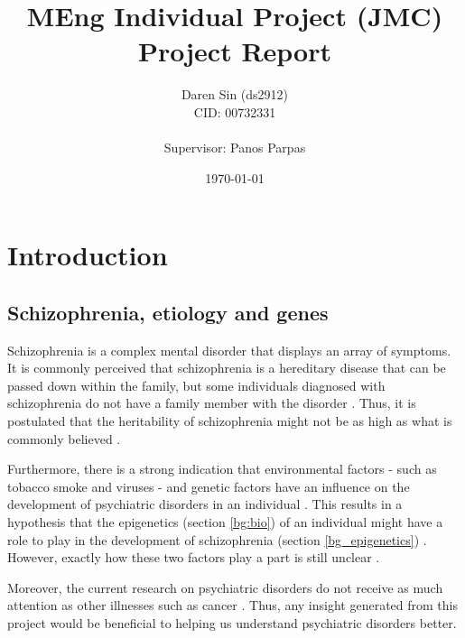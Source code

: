 \documentclass[12pt, twoside, a4paper]{article}
\begin{document}
\title{MEng Individual Project (JMC) \\ Project Report}

\author{Daren Sin (ds2912) \\ CID: 00732331 \\ \\ Supervisor: Panos Parpas}

\date{\today}
\maketitle

\tableofcontents

\newpage

\section{Introduction}


\subsection{Schizophrenia, etiology and genes}

Schizophrenia is a complex mental disorder that displays an array of symptoms. It is commonly perceived that schizophrenia is a hereditary disease that can be passed down within the family, but some individuals diagnosed with schizophrenia do not have a family member with the disorder \cite{RefWorks:8}. Thus, it is postulated that the heritability of schizophrenia might not be as high as what is commonly believed \cite{RefWorks:9}.

Furthermore, there is a strong indication that environmental factors - such as tobacco smoke and viruses - and genetic factors have an influence on the development of psychiatric disorders in an individual \cite{RefWorks:8, RefWorks:10}. This results in a hypothesis that the epigenetics (section \ref{bg:bio}) of an individual might have a role to play in the development of schizophrenia (section \ref{bg_epigenetics}) \cite{RefWorks:12}. However, exactly how these two factors play a part is still unclear \cite{RefWorks:11}.

Moreover, the current research on psychiatric disorders do not receive as much attention as other illnesses such as cancer \cite{RefWorks:82}. Thus, any insight generated from this project would be beneficial to helping us understand psychiatric disorders better.
\end{document}
